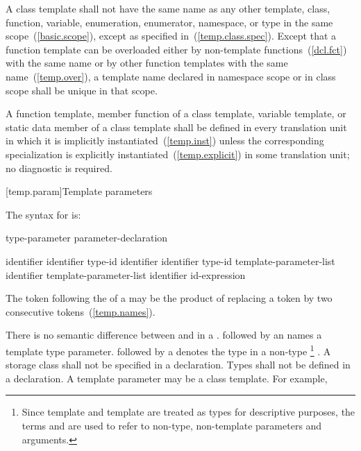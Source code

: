 \pnum
A class template shall not have the same name as any other
template, class, function, variable, enumeration, enumerator, namespace, or
type in the same scope~(\ref{basic.scope}), except as specified in~(\ref{temp.class.spec}).
Except that a function template can be overloaded either by non-template
functions~(\ref{dcl.fct}) with the same name or by other function templates
with the same name~(\ref{temp.over}),
a template name declared in namespace scope or in class scope shall be unique
in that scope.

\pnum
A function template, member function of a class template, variable template,
or static data
member of a class template shall be defined in every translation unit in
which it is implicitly instantiated~(\ref{temp.inst}) unless the
corresponding specialization is explicitly instantiated~(\ref{temp.explicit})
in some translation unit; no diagnostic is required.

[temp.param]{Template parameters}

\pnum
The syntax for
is:

\begin{bnf}
\br
  type-parameter\br
  parameter-declaration
\end{bnf}

\begin{bnf}
\br
   \opt identifier\opt\br
   identifier\opt \terminal{=} type-id\br
   \opt identifier\opt\br
   identifier\opt \terminal{=} type-id\br
   template-parameter-list  \opt identifier\opt\br
   template-parameter-list  identifier\opt \terminal{=} id-expression
\end{bnf}

\enternote The \tcode{>} token following the
 of a
may be the product of replacing a
\tcode{>{>}} token by two consecutive \tcode{>}
tokens~(\ref{temp.names}).\exitnote

\pnum
There is no semantic difference between
and
in a
.
followed by an
names a template type parameter.
followed by a
denotes the type in a non-type \footnote{Since template
and template
are treated as types for descriptive purposes, the terms
and
are used to refer to non-type, non-template parameters and arguments.}
.
A storage class shall not be specified in a
declaration.
Types shall not be defined in a 
declaration.
\enternote
A template parameter may be a class template.
For example,

